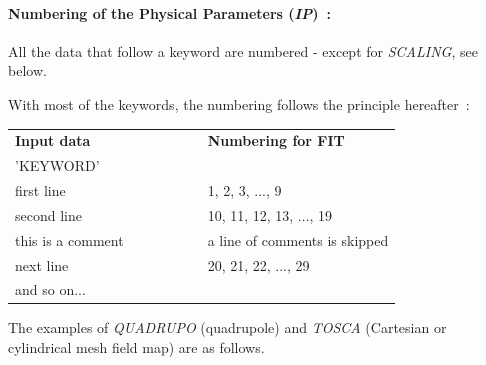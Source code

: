 \paragraph{Numbering of the Physical Parameters (\textsl{IP})~: }

\noindent All the data that follow a keyword are numbered -  except for \textsl{SCALING}, see below. 

\noindent With most of the keywords, the numbering follows the principle hereafter~: 
\begin{center}
{\renewcommand{\arraystretch}{1}
	\begin{tabular}{lcl}
	\textbf{Input  data}  &~~~~~~~~&  \textbf{Numbering  for  FIT}\\
	'KEYWORD'      &&  \\
	first line   && 1, 2, 3, ..., 9 \\
	second  line &&  10, 11, 12, 13, ..., 19 \\
	this  is  a  comment &&  a line of comments is skipped\\
	next line    && 20, 21, 22, ..., 29  \\
	and  so  on... && 
	\end{tabular}    }
\end{center}

\noindent The examples of \textsl{QUADRUPO} (quadrupole) and 
\textsl{TOSCA} (Cartesian or cylindrical mesh field map) are as follows. 

